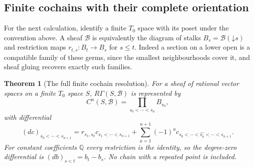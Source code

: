 \documentclass[11pt,a4paper]{article}
\newtheorem{theorem}{Theorem}[section]
\theoremstyle{definition}\newtheorem{definition}[theorem]{Definition}
\providecommand{\RQ}{\mathbb Q}
\begin{document}
\subsection{Finite cochains with their complete orientation}

For the next calculation, identify a finite $T_0$ space with its poset
under the convention above. A sheaf $\mathcal B$ is equivalently the
diagram of stalks $B_s=\mathcal B(\mathord\downarrow s)$ and restriction
maps $r_{t,s}:B_t\to B_s$ for $s\le t$. Indeed a section on a lower
open is a compatible family of these germs, since the smallest
neighbourhoods cover it, and sheaf gluing recovers exactly such families.

\begin{theorem}[The full finite cochain resolution]\label{FL:thm:finite-cochains}
For a sheaf of rational vector spaces on a finite $T_0$ space $S$,
$R\Gamma(S,\mathcal B)$ is represented by
\[
 C^n(S,\mathcal B)=\prod_{s_0<\cdots<s_n}B_{s_0},
 \tag{FL14}\label{FL:eq:cochains}
\]
with differential
\[
 (dc)_{s_0<\cdots<s_{n+1}}
 =r_{s_1,s_0}c_{s_1<\cdots<s_{n+1}}
   +\sum_{a=1}^{n+1}(-1)^a
       c_{s_0<\cdots<\widehat{s_a}<\cdots<s_{n+1}}.
 \tag{FL15}\label{FL:eq:cochain-differential}
\]
For constant coefficients $\RQ$ every restriction is the identity,
so the degree-zero differential is
$(db)_{s<t}=b_t-b_s$. No chain with a repeated point is included.
\end{theorem}
\end{document}
